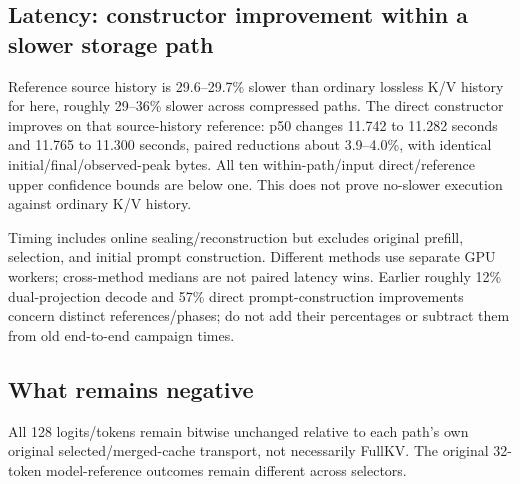 \subsection{Latency: constructor improvement within a slower storage path}
\begin{table}[htbp]
\caption{Fixed-schedule decode seconds. Source/KV comes from the K/V versus
source-history study; remaining columns come from a separate reference-source
versus direct-source constructor study. Do not combine medians across studies.
Intervals are ordinary technical-pair 95\% intervals, not population or
multiplicity-adjusted intervals.}
\label{tab:historylatency}
\end{table}

Reference source history is 29.6--29.7\% slower than ordinary lossless K/V
history for \Evi{} here, roughly 29--36\% slower across compressed paths.
The direct constructor improves on that source-history reference: \Evi{}
p50 changes 11.742 to 11.282 seconds and 11.765 to 11.300 seconds, paired
reductions about 3.9--4.0\%, with identical initial/final/observed-peak bytes.
All ten within-path/input direct/reference upper confidence bounds are below
one. This does not prove no-slower execution against ordinary K/V history.

Timing includes online sealing/reconstruction but excludes original prefill,
selection, and initial prompt construction. Different methods use separate
GPU workers; cross-method medians are not paired latency wins. Earlier
roughly 12\% dual-projection decode and 57\% direct prompt-construction
improvements concern distinct references/phases; do not add their percentages
or subtract them from old end-to-end campaign times.

\subsection{What remains negative}
All 128 logits/tokens remain bitwise unchanged relative to each path's own
original selected/merged-cache transport, not necessarily FullKV. The
original 32-token model-reference outcomes remain different across selectors.

\begin{table}[htbp]
\caption{Consumed-input controls: R-L is model-generated FullKV-reference
ROUGE-L $\times100$, not annotation accuracy, corpus PPL, or standard MM-Vet
judge scoring. Bitwise preservation concerns 128 logits relative to each
path's original transport.}
\label{tab:historyquality}
\end{table}

